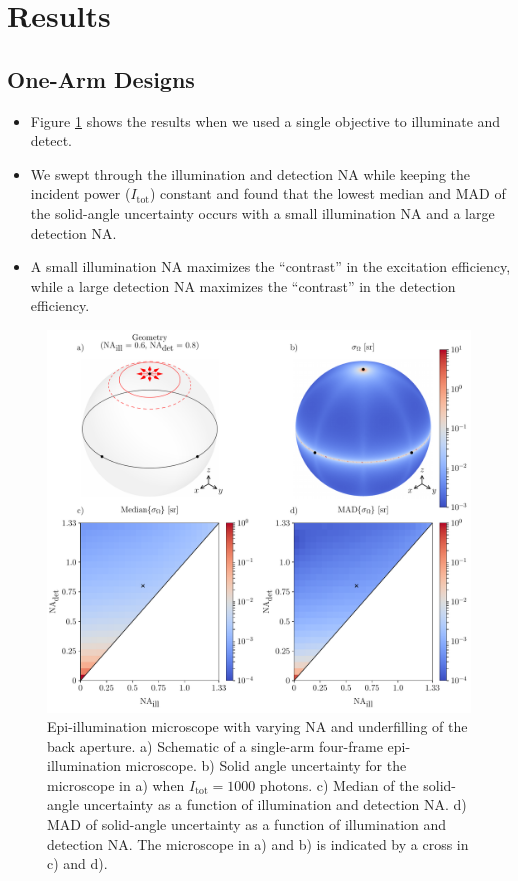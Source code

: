 \documentclass[10pt]{article}
\begin{document}
\section{Results}
\subsection{One-Arm Designs}\label{one-arm}
\begin{itemize}
\item Figure \ref{fig:single-arm} shows the results when we used a single
  objective to illuminate and detect.
\item We swept through the illumination and detection NA while keeping the
  incident power ($I_{\text{tot}}$) constant and found that the lowest median and
  MAD of the solid-angle uncertainty occurs with a small
  illumination NA and a large detection NA.
\item A small illumination NA maximizes the ``contrast'' in the excitation
  efficiency, while a large detection NA maximizes the ``contrast'' in the
  detection efficiency.
\end{itemize}

\begin{figure}[htbp]
\centering\includegraphics[width=\textwidth]{single-arm}
\caption{Epi-illumination microscope with varying NA and underfilling of the
  back aperture. a) Schematic of a single-arm four-frame epi-illumination
  microscope. b) Solid angle uncertainty for the microscope in a) when
  $I_{\text{tot}} = 1000$ photons. c) Median of the solid-angle uncertainty as a
  function of illumination and detection NA. d) MAD of solid-angle uncertainty
  as a function of illumination and detection NA. The microscope in a) and b) is
  indicated by a cross in c) and d).}
\label{fig:single-arm}
\end{figure}
\end{document}

